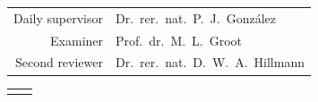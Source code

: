 \begin{titlepage}
\begin{center}
        \vfill

        \begin{tabular}{rl}
            Daily supervisor & Dr.\ rer.\ nat.\ P.\ J.\ González     \\
            Examiner         & Prof.\ dr.\ M.\ L.\ Groot             \\
            Second reviewer  & Dr.\ rer.\ nat.\ D.\ W.\ A.\ Hillmann
        \end{tabular}

        \vfill


        \vfill

        \begin{tabularx}{\textwidth}{vu}
             &
        \end{tabularx}

    \end{center}
\end{titlepage}